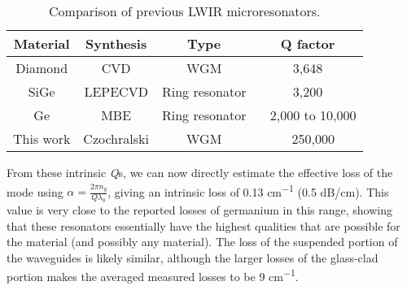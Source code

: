\documentclass[fleqn,10pt,twocolumn]{wlscirep}
\begin{document}
\begin{table}[!htb]
\captionsetup{size=footnotesize}
\caption{Comparison of previous LWIR microresonators.} \label{tab:freq}
\setlength\tabcolsep{0pt} %
\footnotesize\centering
\smallskip 
\begin{tabular*}{\columnwidth}{@{\extracolsep{\fill}}cccc}
    \toprule
    Material & Synthesis & Type & Q factor
    \\ \midrule
    Diamond\cite{leeHighQDiamondMicroresonators2020} & CVD & WGM & 3,648\\
    SiGe\cite{ramirez2019broadband} & LEPECVD & Ring resonator & 3,200  \\
    Ge\cite{kozakGermaniumonsiliconWaveguidesLongwave2021} & MBE & Ring resonator & ~ 2,000 to 10,000 \\
    This work & Czochralski &  WGM & ~ 250,000
    \\ \bottomrule
\end{tabular*}
\end{table}

From these intrinsic \emph{Q}s, we can now directly estimate the effective loss of the mode using $\alpha=\frac{2\pi n_g}{Q\lambda_0}$, giving an intrinsic loss of 0.13 \si{cm^{-1}} (0.5 dB/cm).
This value is very close to the reported losses of germanium in this range, showing that these resonators essentially have the highest qualities that are possible for the material (and possibly any material). The loss of the suspended portion of the waveguides is likely similar, although the larger losses of the glass-clad portion makes the averaged measured losses to be 9 \si{cm^{-1}}.
\end{document}
